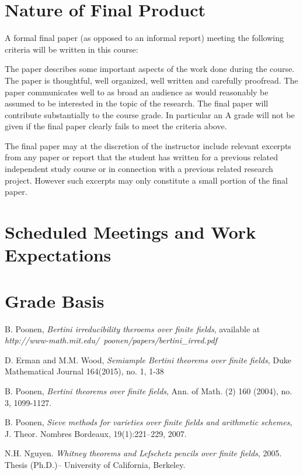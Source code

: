 \documentclass[12pt]{article}
\theoremstyle{plain}
\theoremstyle{definition}
\newcommand{\<}{\langle}
\renewcommand{\>}{\rangle}
\begin{document}
\section{Nature of Final Product}

A formal final paper (as opposed to an informal report) meeting the following criteria will be written in this course:

The paper describes some important aspects of the work done during the course.
The paper is thoughtful, well organized, well written and carefully proofread.
The paper communicates well to as broad an audience as would reasonably be assumed to be interested in the topic of the research.
The final paper will contribute substantially to the course grade. In particular an A grade will not be given if the final paper clearly fails to meet the criteria above.

The final paper may at the discretion of the instructor include relevant excerpts from any paper or report that the student has written for a previous related independent study course or in connection with a previous related research project. However such excerpts may only constitute a small portion of the final paper.

\section{Scheduled Meetings and Work Expectations}

\section{Grade Basis}



\begin{thebibliography}{9}
B. Poonen, \textit{Bertini irreducibility theroems over finite fields}, available at \textit{http://www-math.mit.edu/~poonen/papers/bertini\_irred.pdf}

D. Erman and M.M. Wood, \textit{Semiample Bertini theorems over finite fields}, Duke Mathematical Journal 164(2015), no. 1, 1-38

B. Poonen, \textit{Bertini theorems over finite fields}, Ann. of Math. (2) 160 (2004), no. 3, 1099-1127.

B. Poonen, \textit{Sieve methods for varieties over finite fields and arithmetic schemes}, J. Theor. Nombres Bordeaux, 19(1):221–229, 2007.

N.H. Nguyen. \textit{Whitney theorems and Lefschetz pencils over finite fields}, 2005. Thesis (Ph.D.)–
University of California, Berkeley.
\end{thebibliography}
\end{document}
